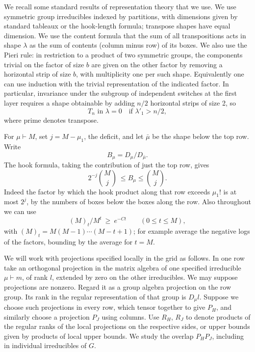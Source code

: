 \label{tra:harmonic-overlaps:representation-and-hook-budgets}
We recall some standard results of representation theory that we use. We use symmetric group irreducibles indexed by partitions, with dimensions given by standard tableaux or the hook-length formula; transpose shapes have equal dimension. We use the content formula \cite[Eq.~(2.1), Proposition~5.3, Theorem~5.8]{VershikOkounkov2005} that the sum of all transpositions acts in shape \(\lambda\) as the sum of contents (column minus row) of its boxes. We also use the Pieri rule: in restriction to a product of two symmetric groups, the components trivial on the factor of size \(b\) are given on the other factor by removing a horizontal strip of size \(b\), with multiplicity one per such shape. Equivalently one can use induction with the trivial representation of the indicated factor. In particular, invariance under the subgroup of independent switches at the first layer requires a shape obtainable by adding \(n/2\) horizontal strips of size 2, so
\begin{equation}
                 T_n\text{ in }\lambda=0\quad\text{if }\lambda'_1>n/2,      \label{tra:harmonic-overlaps:eq2}
\end{equation}
where prime denotes transpose.

For \(\mu\vdash M\), set \(j=M-\mu_1\), the deficit, and let \(\bar\mu\) be the shape below the top row. Write
\[
 B_\mu = D_\mu/D_{\bar\mu}.
\]
The hook formula, taking the contribution of just the top row, gives
\begin{equation}
                      2^{-j}\binom Mj\ \le B_\mu\le \binom Mj.        \label{tra:harmonic-overlaps:eq3}
\end{equation}
Indeed the factor by which the hook product along that row exceeds \(\mu_1!\) is at most \(2^j\), by the numbers of boxes below the boxes along the row. Also throughout we can use
\begin{equation}
                        (M)_t/M^t\ \ge\ e^{-C t}\qquad (0\le t\le M),      \label{tra:harmonic-overlaps:eq4}
\end{equation}
with \((M)_t=M(M-1)\cdots(M-t+1)\); for example average the negative logs of the factors, bounding by the average for \(t=M\).

We will work with projections specified locally in the grid as follows. In one row take an orthogonal projection in the matrix algebra of one specified irreducible \(\mu\vdash m\), of rank \(l\), extended by zero on the other irreducibles. We may suppose projections are nonzero. Regard it as a group algebra projection on the row group. Its rank in the regular representation of that group is \(D_\mu l\). Suppose we choose such projections in every row, which tensor together to give \(P_H\), and similarly choose a projection \(P_J\) using columns. Use \(R_H\), \(R_J\) to denote products of the regular ranks of the local projections on the respective sides, or upper bounds given by products of local upper bounds. We study the overlap \(P_H P_J\), including in individual irreducibles of \(G\).

